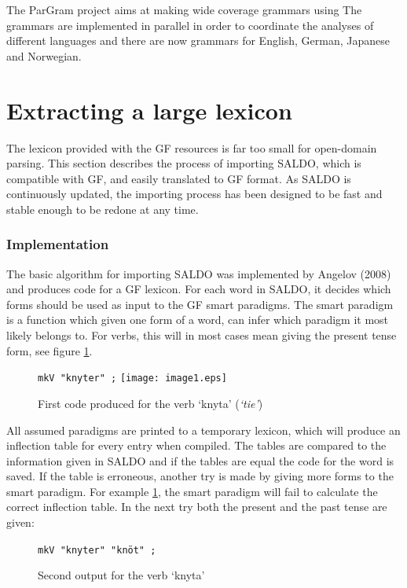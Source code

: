 \documentclass[10pt, a4paper]{article}
\begin{document}
The ParGram \cite{pargram} project aims at making wide coverage grammars using
The grammars are implemented in parallel in order to coordinate the analyses of
different languages and there are now grammars for English, German, Japanese and Norwegian. 


\section{Extracting a large lexicon}
\label{sec:extractsaldo}
The lexicon provided with the GF resources is far too small for open-domain
parsing.
This section describes the process of importing SALDO, which is 
compatible with GF, and easily translated to GF format.
As SALDO is continuously updated, the importing process has been designed to be fast
and stable enough to be redone at any time.

\subsubsection{Implementation}
The basic algorithm for importing SALDO was implemented by Angelov (2008)
and  produces code for a GF lexicon.
For each word in SALDO, it decides which forms should be used as input
to the GF smart paradigms. The smart paradigm is a function which given one
form of a word, can infer which paradigm it most likely belongs to.
For verbs, this will in most cases mean giving
the present tense form, see figure \ref{fig:saldoknyt}. \\

\begin{figure}[h]
\begin{center}
\verb-mkV "knyter" ;-
\texttt{[image: image1.eps]} 
\caption{First code produced for the verb `knyta' (\emph{`tie'})}
\label{fig:saldoknyt}
\end{center}
\end{figure}

All assumed paradigms are printed to a temporary lexicon, 
which will produce an inflection table for every entry when compiled.
The tables are compared to the information given
in SALDO and if the tables are equal the code for the word is saved. If the table
is erroneous, another try is made
by giving more forms to the smart paradigm.
For example \ref{fig:saldoknyt}, the smart paradigm will fail to calculate the
correct inflection table. In the next try both the present and the past tense
are given:\\

\begin{figure}[h]
\begin{center}
\verb-mkV "knyter" "knöt" ;-
\caption{Second output for the verb `knyta'}
\label{fig:saldoknyt2}
\end{center}
\end{figure}
\end{document}
